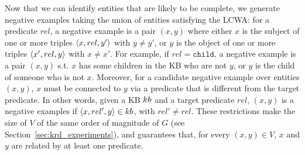 Now that we can identify entities that are likely to be complete, we generate negative examples taking the union of entities satisfying the LCWA: 
for a predicate $rel$, a negative example is a pair $(x,y)$ where either $x$ is the subject of one or more triples $\langle x,rel,y'\rangle$ with $y \neq y'$, or $y$ is the object of one or more triples $\langle x',rel,y\rangle$ with $x \neq x'$. 
For example, if $rel=\texttt{child}$, a negative example is a pair $(x,y)$ s.t. $x$ has some children in the KB who are not $y$, or $y$ is the child of someone who is not $x$. %
Moreover, for a candidate negative example over entities $(x,y)$, $x$ must be connected to $y$ via a predicate that is different from the target predicate. In other words, given a KB ${\sc kb}$ and a target predicate $rel$, $(x,y)$ is a negative examples if $\langle x,rel',y\rangle \in {\sc kb}$, with $rel' \neq rel$. 
These restrictions make the size of $V$ of the same order of magnitude of $G$ (see Section~\ref{sec:krd_experiments}), and guarantees that, for every $(x,y) \in V$, $x$ and $y$ are related by at least one predicate.



